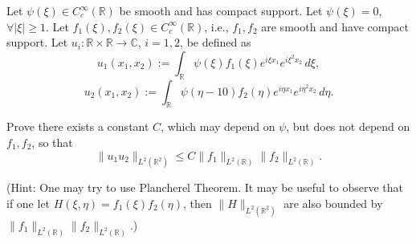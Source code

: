 \begin{exercise}
\label{analysis:2024:3}
Let $\psi(\xi)\in C_c^{\infty}(\mathbb{R})$ be smooth and has compact support. Let $\psi(\xi)=0$, $\forall|\xi|\geq 1$. Let $f_1(\xi), f_2(\xi)\in C_c^{\infty}(\mathbb{R})$, i.e., $f_1,f_2$ are smooth and have compact support. Let $u_i:\mathbb{R}\times\mathbb{R}\to\mathbb{C}$, $i=1,2$, be defined as
\[
u_1(x_1,x_2) := \int_{\mathbb{R}}\psi(\xi)f_1(\xi)e^{i\xi x_1}e^{i\xi^2 x_2}\,d\xi,
\]
\[
u_2(x_1,x_2) := \int_{\mathbb{R}}\psi(\eta-10)f_2(\eta)e^{i\eta x_1}e^{i\eta^2 x_2}\,d\eta.
\]

Prove there exists a constant $C$, which may depend on $\psi$, but does not depend on $f_1,f_2$, so that
\[
\|u_1 u_2\|_{L^2(\mathbb{R}^2)} \leq C\|f_1\|_{L^2(\mathbb{R})}\|f_2\|_{L^2(\mathbb{R})}.
\]

(Hint: One may try to use Plancherel Theorem. It may be useful to observe that if one let $H(\xi,\eta)=f_1(\xi)f_2(\eta)$, then $\|H\|_{L^2(\mathbb{R}^2)}$ are also bounded by $\|f_1\|_{L^2(\mathbb{R})}\|f_2\|_{L^2(\mathbb{R})}$.)
\end{exercise}

